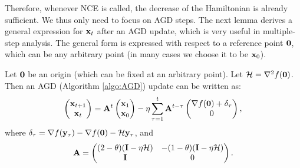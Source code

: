 Therefore, whenever NCE is called, the decrease of the Hamiltonian is already sufficient. We thus only need to focus on AGD steps. The next lemma derives a general expression for $\mathbf{x}_t$ after an AGD update, which is very useful in multiple-step analysis. 
The general form is expressed with respect to a reference point $\mathbf{0}$, which can be any arbitrary point (in many cases we choose it to be $\mathbf{x}_0$).

\begin{lemma}\label{lem:AGD_update_general} 
Let $\mathbf{0}$ be an origin (which can be fixed at an arbitrary point).  Let $\mathcal{H} = \nabla^2 f(\mathbf{0})$.  Then an AGD (Algorithm \ref{algo:AGD}) update can be written as:
\begin{equation}
\begin{pmatrix}
\mathbf{x}_{t+1} \\ \mathbf{x}_t
\end{pmatrix}
= \mathbf{A}^{t}\begin{pmatrix}
\mathbf{x}_1 \\ \mathbf{x}_0
\end{pmatrix} 
-\eta\sum_{\tau = 1}^t \mathbf{A}^{t-\tau}
\begin{pmatrix}
\nabla f(\mathbf{0}) + \delta_\tau \\ 0
\end{pmatrix},
\label{eq:update_AGD_matrix}
\end{equation}
where $\delta_{\tau} = \nabla f(\mathbf{y}_{\tau}) - \nabla f(\mathbf{0}) - \mathcal{H} \mathbf{y}_{\tau}$, and 
$$\mathbf{A} = \begin{pmatrix}
(2-\theta) (\mathbf{I} - \eta \mathcal{H})&  -(1-\theta) (\mathbf{I} - \eta \mathcal{H}) \\
\mathbf{I}& 0
\end{pmatrix}.$$
\end{lemma}

